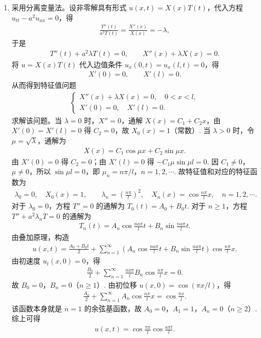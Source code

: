 \documentclass[../../main.tex]{subfiles}%
\begin{document}
\begin{solution}
\begin{enumerate}[(1)]
\item 采用分离变量法。设非零解具有形式 $u(x,t)=X(x)T(t)$，代入方程 $u_{tt}-a^2u_{xx}=0$，得
\begin{align*}
\frac{T''(t)}{a^2T(t)}=\frac{X''(x)}{X(x)}=-\lambda,
\end{align*}
于是
\begin{align*}
T''(t)+a^2\lambda T(t)=0,\qquad X''(x)+\lambda X(x)=0.
\end{align*}
将 $u=X(x)T(t)$ 代入边值条件 $u_x(0,t)=u_x(l,t)=0$，得
\begin{align*}
X'(0)=0,\qquad X'(l)=0.
\end{align*}
从而得到特征值问题
\begin{align*}
\begin{cases}
X''(x)+\lambda X(x)=0,\quad 0<x<l,\\
X'(0)=0,\quad X'(l)=0.
\end{cases}
\end{align*}
求解该问题。当 $\lambda=0$ 时，$X''=0$，通解 $X(x)=C_1+C_2x$，由 $X'(0)=X'(l)=0$ 得 $C_2=0$，故 $X_0(x)=1$（常数）.
当 $\lambda>0$ 时，令 $\mu=\sqrt{\lambda}$，通解为
\begin{align*}
X(x)=C_1\cos \mu x+C_2\sin \mu x.
\end{align*}
由 $X'(0)=0$ 得 $C_2=0$；由 $X'(l)=0$ 得 $-C_1\mu\sin \mu l=0$. 因 $C_1\neq 0$，$\mu\neq 0$，所以 $\sin \mu l=0$，即 $\mu_n=n\pi/l$，$n=1,2,\cdots$. 故特征值和对应的特征函数为
\begin{align*}
\lambda_0=0,\quad X_0(x)=1,\qquad
\lambda_n=\left(\frac{n\pi}{l}\right)^2,\quad X_n(x)=\cos\frac{n\pi}{l}x,\quad n=1,2,\cdots.
\end{align*}
对于 $\lambda_0=0$，方程 $T''=0$ 的通解为 $T_0(t)=A_0+B_0 t$.
对于 $n\geqslant 1$，方程 $T''+a^2\lambda_n T=0$ 的通解为
\begin{align*}
T_n(t)=A_n\cos\frac{na\pi}{l}t+B_n\sin\frac{na\pi}{l}t.
\end{align*}
由叠加原理，构造
\begin{align*}
u(x,t)=\frac{A_0+B_0t}{2}+\sum_{n=1}^{\infty}\left(A_n\cos\frac{na\pi}{l}t+B_n\sin\frac{na\pi}{l}t\right)\cos\frac{n\pi}{l}x.
\end{align*}
由初速度 $u_t(x,0)=0$，得
\begin{align*}
\frac{B_0}{2}+\sum_{n=1}^{\infty}\frac{na\pi}{l}B_n\cos\frac{n\pi}{l}x=0.
\end{align*}
故 $B_0=0$，$B_n=0$（$n\geqslant 1$）.
由初位移 $u(x,0)=\cos(\pi x/l)$，得
\begin{align*}
\frac{A_0}{2}+\sum_{n=1}^{\infty}A_n\cos\frac{n\pi}{l}x=\cos\frac{\pi x}{l}.
\end{align*}
该函数本身就是 $n=1$ 的余弦基函数，故 $A_0=0$，$A_1=1$，$A_n=0$（$n\geqslant 2$）.
综上可得
\begin{align*}
u(x,t)=\cos\frac{\pi x}{l}\cos\frac{a\pi t}{l}.
\end{align*}


\end{enumerate}
\end{solution}
\end{document}
